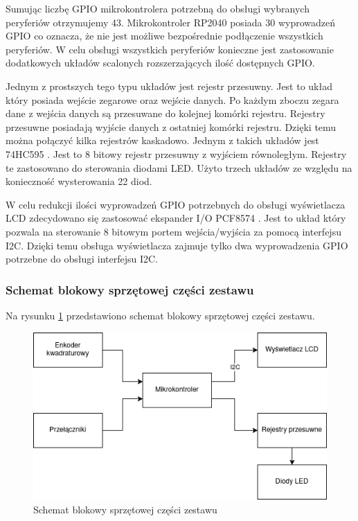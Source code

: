 \documentclass[../main.tex]{subfiles}
\begin{document}
    Sumując liczbę GPIO mikrokontrolera potrzebną do obsługi wybranych peryferiów otrzymujemy 43. 
    Mikrokontroler RP2040 posiada 30 wyprowadzeń GPIO \cite{rp:rp2040} co oznacza, że nie jest możliwe bezpośrednie podłączenie wszystkich peryferiów.
    W celu obsługi wszystkich peryferiów konieczne jest zastosowanie dodatkowych układów scalonych rozszerzających ilość dostępnych GPIO.
    \par
    Jednym z prostszych tego typu układów jest rejestr przesuwny. Jest to układ który posiada wejście zegarowe oraz wejście danych. 
    Po każdym zboczu zegara dane z wejścia danych są przesuwane do kolejnej komórki rejestru. Rejestry przesuwne 
    posiadają wyjście danych z ostatniej komórki rejestru. Dzięki temu można połączyć kilka rejestrów kaskadowo. Jednym z takich układów jest
    74HC595 \cite{ti:74hc595}. Jest to 8 bitowy rejestr przesuwny z wyjściem równoległym. Rejestry te zastosowano do sterowania diodami LED. Użyto trzech
    układów ze względu na konieczność wysterowania 22 diod.
    \par
    W celu redukcji ilości wyprowadzeń GPIO potrzebnych do obsługi wyświetlacza LCD zdecydowano się zastosować ekspander I/O PCF8574 \cite{ti:pcf8574}.
    Jest to układ który pozwala na sterowanie 8 bitowym portem wejścia/wyjścia za pomocą interfejsu I2C. Dzięki temu obsługa wyświetlacza 
    zajmuje tylko dwa wyprowadzenia GPIO potrzebne do obsługi interfejsu I2C. 

    \subsubsection{Schemat blokowy sprzętowej części zestawu}

    Na rysunku \ref{fig:hardware_diagram} przedstawiono schemat blokowy sprzętowej części zestawu.
    
    \begin{figure}[H]
        \centering
        \includegraphics[scale=0.6]{hardware_diagram.png}
        \caption{Schemat blokowy sprzętowej części zestawu}
        \label{fig:hardware_diagram}
    \end{figure}
    
\end{document}
